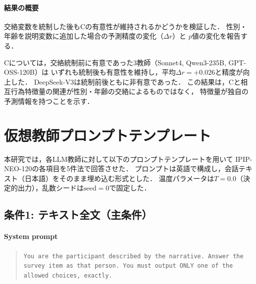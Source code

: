 \documentclass[dvipdfmx,11pt,a4paper]{bxjsarticle}
\renewcommand{\_}{\paperorigunderscore\allowbreak}%
\begin{document}
\paragraph{結果の概要}
交絡変数を統制した後もCの有意性が維持されるかどうかを検証した．
性別・年齢を説明変数に追加した場合の予測精度の変化（$\Delta r$）と
$p$値の変化を報告する．

Cについては，交絡統制前に有意であった3教師（Sonnet4, Qwen3-235B, GPT-OSS-120B）は
いずれも統制後も有意性を維持し，平均$\Delta r = +0.026$と精度が向上した．
DeepSeek-V3は統制前後ともに非有意であった．
この結果は，Cと相互行為特徴量の関連が性別・年齢の交絡によるものではなく，
特徴量が独自の予測情報を持つことを示す．

\section{仮想教師プロンプトテンプレート}
\label{sec:appendix_prompt}

本研究では，各LLM教師に対して以下のプロンプトテンプレートを用いて
IPIP-NEO-120の各項目を5件法で回答させた．
プロンプトは英語で構成し，会話テキスト（日本語）をそのまま埋め込む形式とした．
温度パラメータは$T = 0.0$（決定的出力），乱数シードは$\text{seed} = 0$で固定した．

\subsection{条件1: テキスト全文（主条件）}
\label{sec:appendix_prompt_cond1}

\paragraph{System prompt}
\begin{quote}
\small
\texttt{You are the participant described by the narrative.
Answer the survey item as that person.
You must output ONLY one of the allowed choices, exactly.}
\end{quote}
\end{document}
